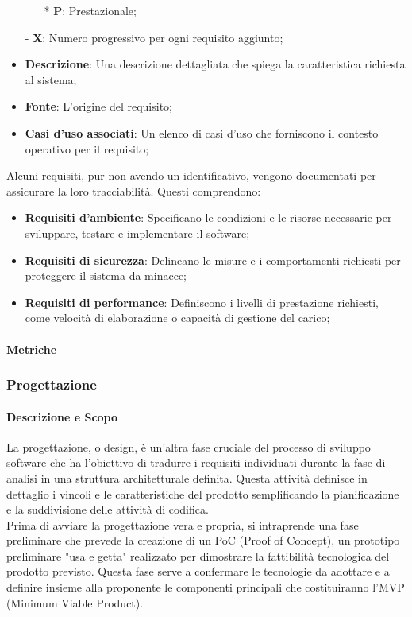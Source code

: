 \documentclass[10pt]{article}
\begin{document}
\begin{justify}
\begin{itemize}
\begin{itemize}
                \item [*] \textbf{P}: Prestazionale;
            \end{itemize}
            \item [-] \textbf{X}: Numero progressivo per ogni requisito aggiunto;
            \item \textbf{Descrizione}: Una descrizione dettagliata che spiega la caratteristica richiesta al sistema;
            \item \textbf{Fonte}: L'origine del requisito;
            \item \textbf{Casi d’uso associati}: Un elenco di casi d'uso che forniscono il contesto operativo per il requisito;
        \end{itemize}
        Alcuni requisiti, pur non avendo un identificativo, vengono documentati per assicurare la loro tracciabilità. Questi comprendono:
        \begin{itemize}
            \item \textbf{Requisiti d’ambiente}: Specificano le condizioni e le risorse necessarie per sviluppare, testare e implementare il software;
            \item \textbf{Requisiti di sicurezza}: Delineano le misure e i comportamenti richiesti per proteggere il sistema da minacce;
            \item \textbf{Requisiti di performance}: Definiscono i livelli di prestazione richiesti, come velocità di elaborazione o capacità di gestione del carico;
        \end{itemize}

        \paragraph{Metriche}

    \subsubsection{Progettazione}

        \paragraph{Descrizione e Scopo}     
        La progettazione, o design, è un'altra fase cruciale del processo di sviluppo software che ha l'obiettivo di tradurre i requisiti individuati durante la fase di analisi in una struttura architetturale definita. Questa attività definisce in dettaglio i vincoli e le caratteristiche del prodotto semplificando la pianificazione e la suddivisione delle attività di codifica.\\
        Prima di avviare la progettazione vera e propria, si intraprende una fase preliminare che prevede la creazione di un PoC (Proof of Concept), un prototipo preliminare "usa e getta" realizzato per dimostrare la fattibilità tecnologica del prodotto previsto. Questa fase serve a confermare le tecnologie da adottare e a definire insieme alla proponente le componenti principali che costituiranno l'MVP (Minimum Viable Product).\\
    

\end{justify}
\end{document}
